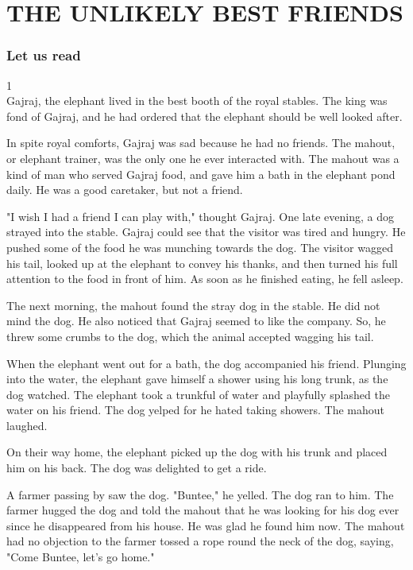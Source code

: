\chapter{THE UNLIKELY BEST FRIENDS}

\subsection{Let us read}
1\\
Gajraj, the elephant lived in the best booth of the royal stables. The king was fond of Gajraj, and he had ordered that the elephant should be well looked after.
\par
In spite royal comforts, Gajraj was sad because he had no friends. The mahout, or elephant trainer, was the only one he ever interacted with. The mahout was a kind of man who served Gajraj food, and gave him a bath in the elephant pond daily. He was a good caretaker, but not a friend.
\par
"I wish I had a friend I can play with," thought Gajraj. One late evening, a dog strayed into the stable. Gajraj could see that the visitor was tired and hungry. He pushed some of the food he was munching towards the dog. The visitor wagged his tail, looked up at the elephant to convey his thanks, and then turned his full attention to the food in front of him. As soon as he finished eating, he fell asleep.
\par
The next morning, the mahout found the stray dog in the stable. He did not mind the dog. He also noticed that Gajraj seemed to like the company. So, he threw some crumbs to the dog, which the animal accepted wagging his tail.
\par
When the elephant went out for a bath, the dog accompanied his friend. Plunging into the water, the elephant gave himself a shower using his long trunk, as the dog watched. The elephant took a trunkful of water and playfully splashed the water on his friend. The dog yelped for he hated taking showers. The mahout laughed.
\par
On their way home, the elephant picked up the dog with his trunk and placed him on his back. The dog was delighted to get a ride.
\par
A farmer passing by saw the dog. "Buntee," he yelled. The dog ran to him. The farmer hugged the dog and told the mahout that he was looking for his dog ever since he disappeared from his house. He was glad he found him now. The mahout had no objection to the farmer tossed a rope round the neck of the dog, saying, "Come Buntee, let's go home."
